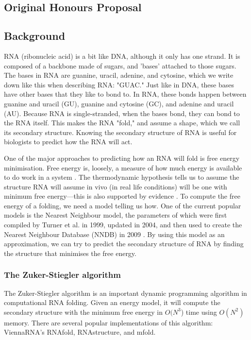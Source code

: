 \documentclass{cshonours}
\def\etal{et al. }
\begin{document}
\begin{appendices}
\chapter{Original Honours Proposal}

\section*{Background}
RNA (ribonucleic acid) is a bit like DNA, although it only has one strand. It is composed of a backbone made of sugars, and 'bases' attached to those sugars. The bases in RNA are guanine, uracil, adenine, and cytosine, which we write down like this when describing RNA: "GUAC." Just like in DNA, these bases have other bases that they like to bond to. In RNA, these bonds happen between guanine and uracil (GU), guanine and cytosine (GC), and adenine and uracil (AU). Because RNA is single-stranded, when the bases bond, they can bond to the RNA itself. This makes the RNA "fold," and assume a shape, which we call its secondary structure. Knowing the secondary structure of RNA is useful for biologists to predict how the RNA will act.\cite{connRnaBackground}

One of the major approaches to predicting how an RNA will fold is free energy minimisation. Free energy is, loosely, a measure of how much energy is available to do work in a system \cite{perrotThermodynamics}. The thermodynamic hypothesis \cite{anfinsenThermodynamicHypothesis} tells us to assume the structure RNA will assume in vivo (in real life conditions) will be one with minimum free energy---this is also supported by evidence \cite{tinocoHowRnaFolds}. To compute the free energy of a folding, we need a model telling us how. One of the current popular models is the Nearest Neighbour model, the parameters of which were first compiled by Turner \etal in 1999\cite{t99}, updated in 2004\cite{t04}, and then used to create the Nearest Neighbour Database (NNDB) in 2009 \cite{tNndb}. By using this model as an approximation, we can try to predict the secondary structure of RNA by finding the structure that minimises the free energy.

\subsection*{The Zuker-Stiegler algorithm}
The Zuker-Stiegler algorithm is an important dynamic programming algorithm in computational RNA folding. Given an energy model, it will compute the secondary structure with the minimum free energy in $O(N^3$) time using $O(N^2)$ memory\cite{zukerDp}. There are several popular implementations of this algorithm: ViennaRNA's RNAfold\cite{viennarna}, RNAstructure\cite{rnastructure}, and mfold\cite{mfold}.


\end{appendices}
\end{document}
